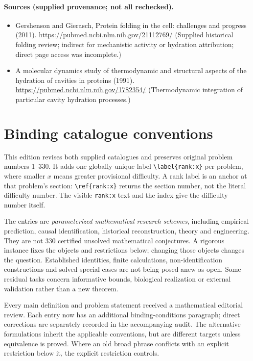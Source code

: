 \documentclass[11pt]{article}
\begin{document}
\paragraph{Sources (supplied provenance; not all rechecked).}
\begin{itemize}
\item Gershenson and Gierasch, Protein folding in the cell: challenges and progress (2011). \url{https://pubmed.ncbi.nlm.nih.gov/21112769/} (Supplied historical folding review; indirect for mechanistic activity or hydration attribution; direct page access was incomplete.)
\item A molecular dynamics study of thermodynamic and structural aspects of the hydration of cavities in proteins (1991). \url{https://pubmed.ncbi.nlm.nih.gov/1782354/} (Thermodynamic integration of particular cavity hydration processes.)
\end{itemize}


\section*{Binding catalogue conventions}
This edition revises both supplied catalogues and preserves original problem numbers 1--330. It adds one globally unique label \verb|\label{rank:x}| per problem, where smaller $x$ means greater provisional difficulty. A rank label is an anchor at that problem's section: \verb|\ref{rank:x}| returns the section number, not the literal difficulty number. The visible \texttt{rank:x} text and the index give the difficulty number itself.

The entries are \emph{parameterized mathematical research schemes}, including empirical prediction, causal identification, historical reconstruction, theory and engineering. They are not 330 certified unsolved mathematical conjectures. A rigorous instance fixes the objects and restrictions below; changing those objects changes the question. Established identities, finite calculations, non-identification constructions and solved special cases are not being posed anew as open. Some residual tasks concern informative bounds, biological realization or external validation rather than a new theorem.

Every main definition and problem statement received a mathematical editorial review. Each entry now has an additional binding-conditions paragraph; direct corrections are separately recorded in the accompanying audit. The alternative formulations inherit the applicable conventions, but are different targets unless equivalence is proved. Where an old broad phrase conflicts with an explicit restriction below it, the explicit restriction controls.
\end{document}
